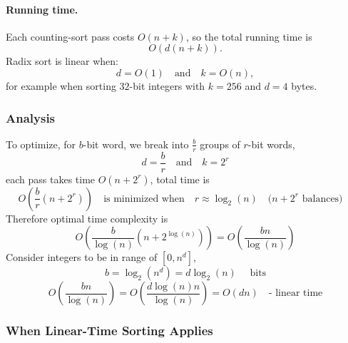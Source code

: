 \documentclass[9pt]{extarticle}
\begin{document}
\paragraph{Running time.}
Each counting-sort pass costs $O(n + k)$, so the total running time is
\[
    O(d(n + k)).
\]
Radix sort is linear when:
\[
    d = O(1) \quad\text{and}\quad k = O(n),
\]
for example when sorting $32$-bit integers with $k=256$ and $d=4$ bytes.
\subsubsection*{Analysis}
To optimize, for $b$-bit word, we break into $\frac{b}{r}$ groups of $r$-bit words,
\[d = \frac{b}{r}\quad\text{and}\quad k = 2^r\]
each pass takes time $O(n + 2^r)$, total time is 
\[O(\frac{b}{r}(n + 2^r)) \quad\text{is minimized when}\quad r \approx \log_2(n) \quad (n+2^r\text{ balances)}\quad\]
Therefore optimal time complexity is
\[O(\frac{b}{\log(n)}(n+2^{\log(n)})) = O(\frac{bn}{\log(n)})\]
Consider integers to be in range of $[0, n^d]$, 
\[b = \log_2(n^d)=d\log_2(n) \quad\text{ bits}\]
\[O(\frac{bn}{\log(n)}) = O(\frac{d\log(n)n}{\log(n)}) = O(dn) \quad\text{- linear time}\]
\subsubsection*{When Linear-Time Sorting Applies}
\end{document}
